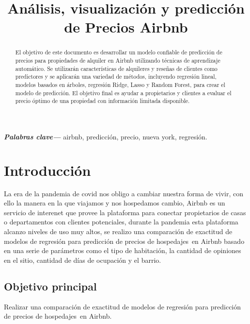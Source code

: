 \documentclass[conference]{IEEEtran}
\begin{document}
\title{Análisis, visualización y predicción de Precios Airbnb}

\author{%
}

\maketitle

\begin{abstract}
  El objetivo de este documento es desarrollar un modelo confiable de predicción de precios para propiedades de alquiler en Airbnb utilizando técnicas de aprendizaje automático. Se utilizarán características de alquileres y reseñas de clientes como predictores y se aplicarán una variedad de métodos, incluyendo regresión lineal, modelos basados en árboles, regresión Ridge, Lasso y Random Forest, para crear el modelo de predicción. El objetivo final es ayudar a propietarios y clientes a evaluar el precio óptimo de una propiedad con información limitada disponible.
\end{abstract}

\providecommand{\keywords}[1]
{
  \small	
  \textbf{\textit{Palabras clave---}} #1
}
\keywords{airbnb, predicción, precio, nueva york, regresión.}

\section{Introducción}
La era de la pandemia de covid nos obligo a cambiar nuestra forma de vivir, con ello la manera en la que viajamos y nos hospedamos cambio, Airbnb es un servicio de interenet que provee la plataforma para conectar propietarios de casas o departamentos con clientes potenciales, durante la pandemia esta plataforma alcanzo niveles de uso muy altos, se realizo una comparación de exactitud de modelos de regresión para predicción de precios de hospedajes en Airbnb basado en una serie de parámetros como el tipo de habitación, la cantidad de opiniones en el sitio, cantidad de días de ocupación y el barrio.

\subsection{Objetivo principal}
Realizar una comparación de exactitud de modelos de regresión para predicción de precios de hospedajes en Airbnb.
\end{document}
